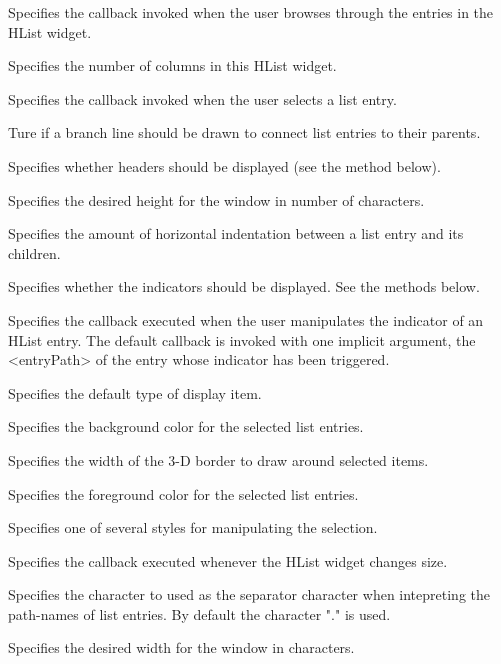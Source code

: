 \begin{enum}{1cm}

Specifies the callback invoked when the user browses through the entries in the HList widget. 

Specifies the number of columns in this HList widget.

Specifies the callback invoked when the user selects a list entry.

Ture if a branch line should be drawn to connect list entries to their parents. 

Specifies whether headers should be displayed (see the  method below). 

Specifies the desired height for the window in number of characters. 

Specifies the amount of horizontal indentation between a list entry and its children.

Specifies whether the indicators should be displayed. See the  methods below. 

Specifies the callback executed when the user manipulates the indicator of an HList entry.
The default callback is invoked with one implicit argument, the <entryPath> of the entry whose indicator has been triggered.

Specifies the default type of display item.

Specifies the background color for the selected list entries. 

Specifies the width of the 3-D border to draw around selected items.

Specifies the foreground color for the selected list entries. 

Specifies one of several styles for manipulating the selection.

Specifies the callback executed whenever the HList widget changes size.

Specifies the character to used as the separator character when intepreting the path-names of list entries.
By default the character "." is used. 

Specifies the desired width for the window in characters. 


\end{enum}

